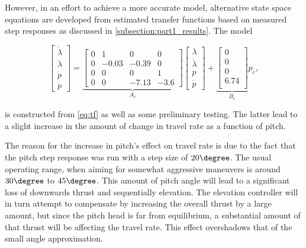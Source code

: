 However, in an effort to achieve a more accurate model, alternative state space equations are developed from estimated transfer functions based on measured step responses as discussed in \ref{subsection:part1_results}. The model

\begin{equation}
	\begin{bmatrix}
		\dot{\lambda}\\
		\ddot{\lambda}\\
		\dot{p}\\
		\ddot{p}
	\end{bmatrix} = 
	\underbrace{
	\begin{bmatrix}
		0 & 1 & 0 & 0 \\
		0 & -0.03 & -0.39 & 0 \\
		0 & 0 & 0 & 1 \\
		0 & 0 & -7.13 & -3.6
	\end{bmatrix}}_{A_c}
	\begin{bmatrix}
		\lambda	\\
		\dot{\lambda}		\\
		p		\\
		\dot{p}
	\end{bmatrix} +
	\underbrace{
	\begin{bmatrix}
		0 \\
		0 \\
		0 \\
		6.74 \\
	\end{bmatrix}}_{B_c}
	p_c,
	\label{eq:sys}
\end{equation}

is constructed from \eqref{eq:tf} as well as some preliminary testing. The latter lead to a slight increase in the amount of change in travel rate as a function of pitch.

The reason for the increase in pitch's effect on travel rate is due to the fact that the pitch step response was run with a step size of $20\degree$. The usual operating range, when aiming for somewhat aggressive maneuvers is around $30\degree$ to $45\degree$. This amount of pitch angle will lead to a significant loss of downwards thrust and sequentially elevation. The elevation controller will in turn attempt to compensate by increasing the overall thrust by a large amount, but since the pitch head is far from equilibrium, a substantial amount of that thrust will be affecting the travel rate. This effect overshadows that of the small angle approximation.


